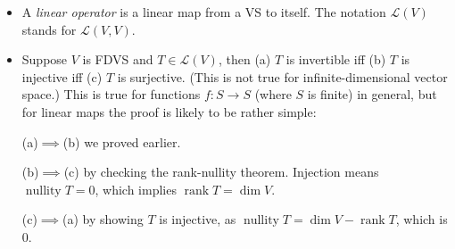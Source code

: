 \documentclass{article}
\renewcommand{\d}{\dim}
\newcommand{\LV}{\mathcal{L}(V)}
\begin{document}
\begin{itemize}
\begin{itemize}
    \end{itemize}
    \item A \textit{linear operator} is a linear map from a VS to itself. The notation $\LV$ stands for $\mathcal{L}(V,V)$.
    \item Suppose $V$ is FDVS and $T \in \LV$, then (a) $T$ is invertible iff (b) $T$ is injective iff (c) $T$ is surjective. (This is not true for infinite-dimensional vector space.) This is true for functions $f:S \to S$ (where $S$ is finite) in general, but for linear maps the proof is likely to be rather simple:
        
    (a)$\implies$(b) we proved earlier.
        
    (b)$\implies$(c) by checking the rank-nullity theorem. Injection means $\operatorname{nullity} T = 0$, which implies $\operatorname{rank} T = \d V$.
        
    (c)$\implies$(a) by showing $T$ is injective, as $\operatorname{nullity} T = \d V - \operatorname{rank} T$, which is 0.
\end{itemize}
\end{document}
